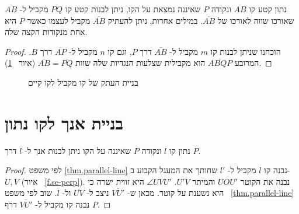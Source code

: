 \begin{theorem}
נתון קטע קו
$\overline{AB}$
ונקודה 
$P$
שאיננה נמצאת על הקו, ניתן לבנות קטע קו
$\overline{PQ}$
מקביל ל-%
$\overline{AB}$
שאורכו שווה לאורכו של
$\overline{AB}$.
במילים אחרות, ניתן להעתיק 
$\overline{AB}$
מקביל לעצמו כאשר 
$P$
היא אחת מנקודות הקצה שלה.
\end{theorem}

\begin{proof}
הוכחנו שניתן לבנות קו
$m$
מקביל ל-%
$\overline{AB}$
דרך 
$P$,
וגם קו
$n$
מקביל ל-%
$\overline{AP}$
דרך
$B$.
המרובע
$\overline{ABQP}$
הוא מקבילית שצלעות הנגדיות שלה שוות 
$\overline{AB}=\overline{PQ}$
(איור%
~\ref{f.se-parallel-other4}).
\end{proof}

\begin{figure}[tb]
\begin{center}
\caption{בניית העתק של קו מקביל לקו קיים}\label{f.se-parallel-other4}
\end{center}
\end{figure}


\section{בניית אנך לקו נתון}\label{s.perpendicular}

\begin{theorem}\label{thm.perpendicular}
נתון קו
$l$
ונקודה
$P$
שאיננה על הקו ניתן לבנות אנך ל-%
$l$
דרך
$P$.%
\end{theorem}

\begin{proof}
לפי משפט
\ref{thm.parallel-line}
נבנה קו
$l$
מקביל ל-%
$l'$
שחותך את המעגל הקבוע ב-%
$U,V$
(איור%
~\ref{f.se-perp}).
נבנה את הקוטר
$\overline{UOU'}$
והמיתר
$\overline{U'V}$.
$\angle UVU'$
היא זווית ישרה כי היא נשענת על קוטר. מכאן ש-%
$\overline{VU'}$
ניצב ל-%
$\overline{UV}$
ול-%
$l$.
שוב לפי משפט%
~\ref{thm.parallel-line}
נבנה קו מקביל ל-%
$\overline{VU'}$
דרף
$P$.
\end{proof}

